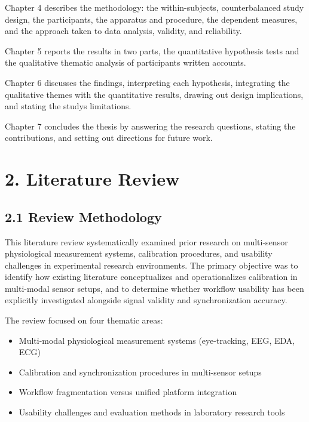 \documentclass[
]{article}
\begin{document}
Chapter 4 describes the methodology: the within-subjects, counterbalanced study design, the participants, the apparatus and procedure, the dependent measures, and the approach taken to data analysis, validity, and reliability.

Chapter 5 reports the results in two parts, the quantitative hypothesis tests and the qualitative thematic analysis of participants\textquotesingle{} written accounts.

Chapter 6 discusses the findings, interpreting each hypothesis, integrating the qualitative themes with the quantitative results, drawing out design implications, and stating the study\textquotesingle s limitations.

Chapter 7 concludes the thesis by answering the research questions, stating the contributions, and setting out directions for future work.

\clearpage
\hypertarget{literature-review}{%
\section{\texorpdfstring{2. Literature Review }{2. Literature Review }}\label{literature-review}}

\hypertarget{review-methodology}{%
\subsection{\texorpdfstring{2.1 Review Methodology }{2.1 Review Methodology }}\label{review-methodology}}

This literature review systematically examined prior research on multi-sensor physiological measurement systems, calibration procedures, and usability challenges in experimental research environments. The primary objective was to identify how existing literature conceptualizes and operationalizes calibration in multi-modal sensor setups, and to determine whether workflow usability has been explicitly investigated alongside signal validity and synchronization accuracy.

The review focused on four thematic areas:

\begin{itemize}
\item
  Multi-modal physiological measurement systems (eye-tracking, EEG, EDA, ECG)
\item
  Calibration and synchronization procedures in multi-sensor setups
\item
  Workflow fragmentation versus unified platform integration
\item
  Usability challenges and evaluation methods in laboratory research tools
\end{itemize}
\end{document}
